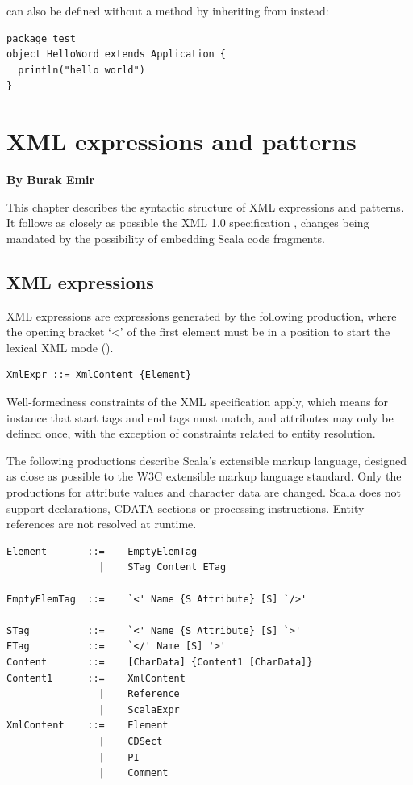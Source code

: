  can also be defined without a  method 
by inheriting from  instead:
\begin{lstlisting}
package test 
object HelloWord extends Application {
  println("hello world")
}
\end{lstlisting}

\chapter{XML expressions and patterns}

{\bf By Burak Emir}\bigskip\bigskip


This chapter describes the syntactic structure of XML expressions and patterns.
It follows as closely as possible the XML 1.0 specification \cite{w3c:xml},
changes being mandated by the possibility of embedding Scala code fragments.

\section{XML expressions}
XML expressions are expressions generated by the following production, where the 
opening bracket `<' of the first element must be in a position to start the lexical
XML mode ().

\syntax\begin{lstlisting}
XmlExpr ::= XmlContent {Element}
\end{lstlisting}
Well-formedness constraints of the XML specification apply, which
means for instance that start tags and end tags must match, and
attributes may only be defined once, with the exception of constraints
related to entity resolution.

The following productions describe Scala's extensible markup language,
designed as close as possible to the W3C extensible markup language
standard. Only the productions for attribute values and character data
are changed. Scala does not support declarations, CDATA
sections or processing instructions. Entity references are not
resolved at runtime.

\syntax\begin{lstlisting}
Element       ::=    EmptyElemTag
                |    STag Content ETag                                       

EmptyElemTag  ::=    `<' Name {S Attribute} [S] `/>'                         

STag          ::=    `<' Name {S Attribute} [S] `>'                          
ETag          ::=    `</' Name [S] '>'                                        
Content       ::=    [CharData] {Content1 [CharData]}
Content1      ::=    XmlContent
                |    Reference
                |    ScalaExpr
XmlContent    ::=    Element
                |    CDSect
                |    PI
                |    Comment
\end{lstlisting}

